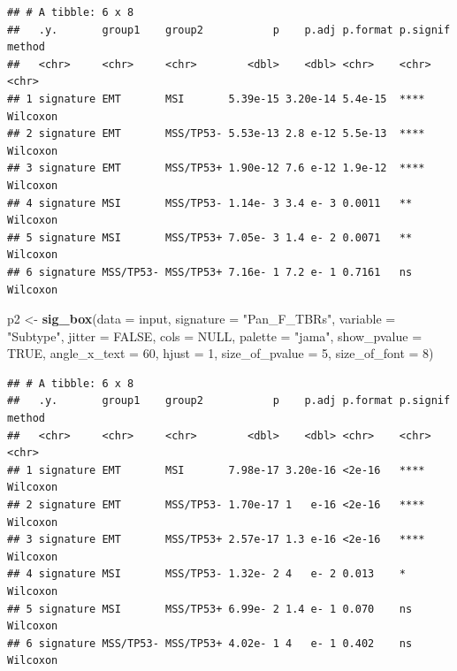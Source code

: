 \documentclass[
  12pt,
]{book}
\newenvironment{Shaded}{\begin{snugshade}}{\end{snugshade}}
\newcommand{\AttributeTok}[1]{\textcolor[rgb]{0.13,0.29,0.53}{#1}}
\newcommand{\ConstantTok}[1]{\textcolor[rgb]{0.56,0.35,0.01}{#1}}
\newcommand{\DecValTok}[1]{\textcolor[rgb]{0.00,0.00,0.81}{#1}}
\newcommand{\FunctionTok}[1]{\textcolor[rgb]{0.13,0.29,0.53}{\textbf{#1}}}
\newcommand{\NormalTok}[1]{#1}
\newcommand{\OtherTok}[1]{\textcolor[rgb]{0.56,0.35,0.01}{#1}}
\newcommand{\StringTok}[1]{\textcolor[rgb]{0.31,0.60,0.02}{#1}}
\begin{document}
\begin{verbatim}
## # A tibble: 6 x 8
##   .y.       group1    group2           p    p.adj p.format p.signif method  
##   <chr>     <chr>     <chr>        <dbl>    <dbl> <chr>    <chr>    <chr>   
## 1 signature EMT       MSI       5.39e-15 3.20e-14 5.4e-15  ****     Wilcoxon
## 2 signature EMT       MSS/TP53- 5.53e-13 2.8 e-12 5.5e-13  ****     Wilcoxon
## 3 signature EMT       MSS/TP53+ 1.90e-12 7.6 e-12 1.9e-12  ****     Wilcoxon
## 4 signature MSI       MSS/TP53- 1.14e- 3 3.4 e- 3 0.0011   **       Wilcoxon
## 5 signature MSI       MSS/TP53+ 7.05e- 3 1.4 e- 2 0.0071   **       Wilcoxon
## 6 signature MSS/TP53- MSS/TP53+ 7.16e- 1 7.2 e- 1 0.7161   ns       Wilcoxon
\end{verbatim}

\begin{Shaded}
\begin{Highlighting}[]
\NormalTok{p2 }\OtherTok{\textless{}{-}} \FunctionTok{sig\_box}\NormalTok{(}\AttributeTok{data           =}\NormalTok{ input, }
              \AttributeTok{signature      =} \StringTok{"Pan\_F\_TBRs"}\NormalTok{,}
              \AttributeTok{variable       =} \StringTok{"Subtype"}\NormalTok{,}
              \AttributeTok{jitter         =} \ConstantTok{FALSE}\NormalTok{,}
              \AttributeTok{cols           =} \ConstantTok{NULL}\NormalTok{,}
              \AttributeTok{palette        =} \StringTok{"jama"}\NormalTok{,}
              \AttributeTok{show\_pvalue    =} \ConstantTok{TRUE}\NormalTok{,}
              \AttributeTok{angle\_x\_text   =} \DecValTok{60}\NormalTok{, }
              \AttributeTok{hjust          =} \DecValTok{1}\NormalTok{, }
              \AttributeTok{size\_of\_pvalue =} \DecValTok{5}\NormalTok{, }
              \AttributeTok{size\_of\_font   =} \DecValTok{8}\NormalTok{)}
\end{Highlighting}
\end{Shaded}

\begin{verbatim}
## # A tibble: 6 x 8
##   .y.       group1    group2           p    p.adj p.format p.signif method  
##   <chr>     <chr>     <chr>        <dbl>    <dbl> <chr>    <chr>    <chr>   
## 1 signature EMT       MSI       7.98e-17 3.20e-16 <2e-16   ****     Wilcoxon
## 2 signature EMT       MSS/TP53- 1.70e-17 1   e-16 <2e-16   ****     Wilcoxon
## 3 signature EMT       MSS/TP53+ 2.57e-17 1.3 e-16 <2e-16   ****     Wilcoxon
## 4 signature MSI       MSS/TP53- 1.32e- 2 4   e- 2 0.013    *        Wilcoxon
## 5 signature MSI       MSS/TP53+ 6.99e- 2 1.4 e- 1 0.070    ns       Wilcoxon
## 6 signature MSS/TP53- MSS/TP53+ 4.02e- 1 4   e- 1 0.402    ns       Wilcoxon
\end{verbatim}
\end{document}
